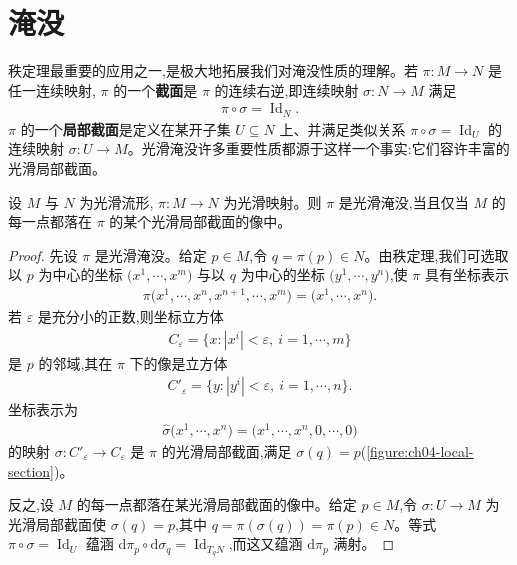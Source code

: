 \documentclass[../../main.tex]{subfiles}
\begin{document}
\section{淹没}\label{section:ch04-淹没}

秩定理最重要的应用之一,是极大地拓展我们对淹没性质的理解。若 $\pi:M\to N$ 是任一连续映射, $\pi$ 的一个\textbf{截面}是 $\pi$ 的连续右逆,即连续映射 $\sigma:N\to M$ 满足
\begin{align*}
\pi\circ\sigma=\operatorname{Id}_N.
\end{align*}
$\pi$ 的一个\textbf{局部截面}是定义在某开子集 $U\subseteq N$ 上、并满足类似关系 $\pi\circ\sigma=\operatorname{Id}_U$ 的连续映射 $\sigma:U\to M$。光滑淹没许多重要性质都源于这样一个事实:它们容许丰富的光滑局部截面。

\begin{theorem}\label{theorem:ch04-local-section}
设 $M$ 与 $N$ 为光滑流形, $\pi:M\to N$ 为光滑映射。则 $\pi$ 是光滑淹没,当且仅当 $M$ 的每一点都落在 $\pi$ 的某个光滑局部截面的像中。
\end{theorem}

\begin{proof}
先设 $\pi$ 是光滑淹没。给定 $p\in M$,令 $q=\pi(p)\in N$。由秩定理,我们可选取以 $p$ 为中心的坐标 $\bigl(x^1,\cdots ,x^m\bigr)$ 与以 $q$ 为中心的坐标 $\bigl(y^1,\cdots ,y^n\bigr)$,使 $\pi$ 具有坐标表示
\begin{align*}
\pi\bigl(x^1,\cdots ,x^n,x^{n+1},\cdots ,x^m\bigr)=\bigl(x^1,\cdots ,x^n\bigr).
\end{align*}
若 $\varepsilon$ 是充分小的正数,则坐标立方体
\begin{align*}
C_\varepsilon=\{x:|x^i|<\varepsilon,\ i=1,\cdots ,m\}
\end{align*}
是 $p$ 的邻域,其在 $\pi$ 下的像是立方体
\begin{align*}
C'_\varepsilon=\{y:|y^i|<\varepsilon,\ i=1,\cdots ,n\}.
\end{align*}
坐标表示为
\begin{align*}
\widehat{\sigma}\bigl(x^1,\cdots ,x^n\bigr)=\bigl(x^1,\cdots ,x^n,0,\cdots ,0\bigr)
\end{align*}
的映射 $\sigma:C'_\varepsilon\to C_\varepsilon$ 是 $\pi$ 的光滑局部截面,满足 $\sigma(q)=p$(\cref{figure:ch04-local-section})。

反之,设 $M$ 的每一点都落在某光滑局部截面的像中。给定 $p\in M$,令 $\sigma:U\to M$ 为光滑局部截面使 $\sigma(q)=p$,其中 $q=\pi(\sigma(q))=\pi(p)\in N$。等式 $\pi\circ\sigma=\operatorname{Id}_U$ 蕴涵 $\mathrm{d}\pi_p\circ\mathrm{d}\sigma_q=\operatorname{Id}_{T_qN}$,而这又蕴涵 $\mathrm{d}\pi_p$ 满射。
\end{proof}
\end{document}
